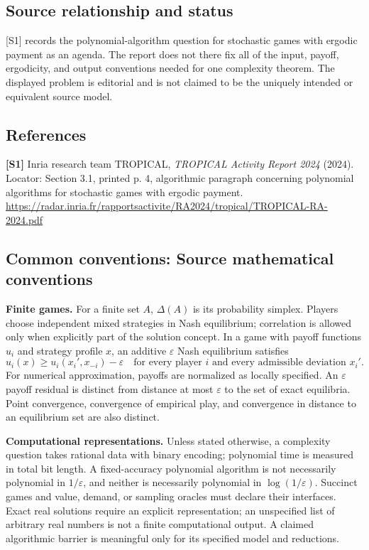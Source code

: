 \documentclass[11pt,a4paper]{article}
\begin{document}
\subsection*{Source relationship and status}
[S1] records the polynomial-algorithm question for stochastic games with ergodic payment as an agenda. The report does not there fix all of the input, payoff, ergodicity, and output conventions needed for one complexity theorem. The displayed problem is editorial and is not claimed to be the uniquely intended or equivalent source model.
\subsection*{References}
\begingroup\footnotesize\raggedright
\textbf{[S1]} Inria research team TROPICAL, \emph{TROPICAL Activity Report 2024} (2024). Locator: Section 3.1, printed p. 4, algorithmic paragraph concerning polynomial algorithms for stochastic games with ergodic payment. \url{https://radar.inria.fr/rapportsactivite/RA2024/tropical/TROPICAL-RA-2024.pdf}
\par\endgroup

\subsection*{Common conventions: Source mathematical conventions}

\textbf{Finite games.} For a finite set $A$, $\Delta(A)$ is its probability
simplex. Players choose independent mixed strategies in Nash equilibrium;
correlation is allowed only when explicitly part of the solution concept.
In a game with payoff functions $u_i$ and strategy profile $x$, an additive
$\varepsilon$ Nash equilibrium satisfies
\[
 u_i(x)\geq u_i(x_i',x_{-i})-\varepsilon
 \quad\text{for every player $i$ and every admissible deviation $x_i'$}.
\]
For numerical approximation, payoffs are normalized as locally specified.
An $\varepsilon$ payoff residual is distinct from distance at most
$\varepsilon$ to the set of exact equilibria. Point convergence, convergence
of empirical play, and convergence in distance to an equilibrium set are
also distinct.

\textbf{Computational representations.} Unless stated otherwise, a complexity
question takes rational data with binary encoding; polynomial time is measured
in total bit length. A fixed-accuracy polynomial algorithm is not necessarily
polynomial in $1/\varepsilon$, and neither is necessarily polynomial in
$\log(1/\varepsilon)$. Succinct games and value, demand, or sampling oracles
must declare their interfaces. Exact real solutions require an explicit
representation; an unspecified list of arbitrary real numbers is not a
finite computational output. A claimed algorithmic barrier is meaningful
only for its specified model and reductions.
\end{document}
